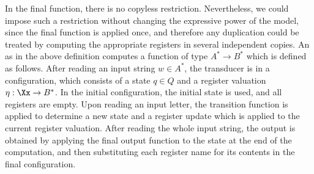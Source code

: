 In the final function, there is no copyless restriction. Nevertheless, we could impose such a restriction without changing the expressive power of the model, since the final function is applied once, and therefore any duplication could be treated by computing the appropriate registers in several independent copies.
An \sst as in the above definition computes a function of type $A^* \to B^*$ which is defined as follows. After reading an input string $w \in A^*$, the transducer is in a configuration, which consists of a state $q \in Q$ and a register valuation $\eta : \Xx \to B^*$. In the initial configuration, the initial state is used, and all registers are empty. Upon reading an input letter, the transition function is applied to determine a new state and a register update which is applied to the current register valuation. After reading the whole input string, the output is obtained by applying the final output function to the  state at the end of the computation, and then substituting each register name for its contents in the final configuration.



